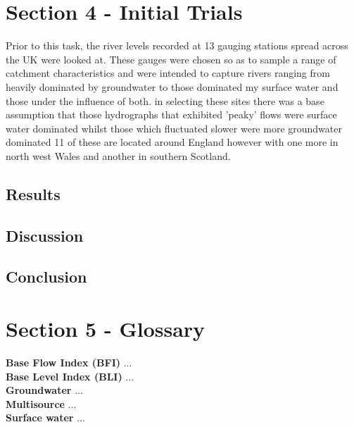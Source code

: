 \documentclass[DIV=calc, paper=a4, fontsize=11pt, twocolumn]{scrartcl}	 %
\begin{document}
\section*{Section 4 - Initial Trials}
Prior to this task, the river levels recorded at 13 gauging stations spread across the UK were looked at. These gauges were chosen so as to sample a range of catchment characteristics and were intended to capture rivers ranging from heavily dominated by groundwater to those dominated my surface water and those under the influence of both. in selecting these sites there was a base assumption that those hydrographs that exhibited 'peaky' flows were surface water dominated whilst those which fluctuated slower were more groundwater dominated 11 of these are located around England however with one more in north west Wales and another in southern Scotland.
	\subsection*{Results}	
	\subsection*{Discussion}
	\subsection*{Conclusion}

\section*{Section 5 - Glossary}	
\textbf{Base Flow Index (BFI)} ...\\
\textbf{Base Level Index (BLI)} ...\\
\textbf{Groundwater} ...\\
\textbf{Multisource} ...\\
\textbf{Surface water} ...\\

{}


%

\end{document}
